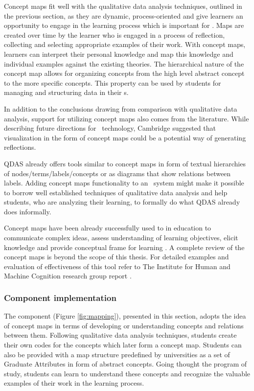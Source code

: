 Concept maps fit well with the qualitative data analysis techniques, outlined in
the previous section, as they are dynamic, process-oriented and give learners an
opportunity to engage in the learning process \citep{Mcaleese1998} which is
important for \LLLs \citep{Schuetze2006,Divjak2004}. Maps are created over time
by the learner who is engaged in a process of reflection, collecting and
selecting appropriate examples of their work. With concept maps, learners can
interpret their personal knowledge and map this knowledge and individual
examples against the existing theories. The hierarchical nature of the concept
map allows for organizing concepts from the high level abstract concept to the
more specific concepts. This property can be used by students for managing and
structuring data in their \ep s. 

In addition to the conclusions drawing from comparison with qualitative data
analysis, support for utilizing concept maps also comes from the literature.
While describing future directions for \ep~technology, Cambridge
\citeyearpar{Cambridge2010} suggested that visualization in the form of concept
maps could be a potential way of generating reflections.

QDAS already offers tools similar to concept maps in form of textual hierarchies
of nodes/terms/labels/concepts or as diagrams that show relations between
labels. Adding concept maps functionality to an \ep~system might make it
possible to borrow well established techniques of qualitative data analysis and
help students, who are analyzing their learning, to formally do what QDAS
already does informally. 

Concept maps have been already successfully used to in education to communicate
complex ideas, assess understanding of learning objectives, elicit knowledge and
provide conceptual frame for learning \citep{Novak2010}. A complete review of
the concept maps is beyond the scope of this thesis. For detailed examples and
evaluation of effectiveness of this tool refer to The Institute for Human and
Machine Cognition research group report \citep{Canas2003}.

\subsubsection{Component implementation}

The component (Figure \ref{fig:mapping}), presented in this section, adopts the
idea of concept maps in terms of developing or understanding concepts and
relations between them. Following qualitative data analysis techniques, students
create their own codes for the concepts which later form a concept map. Students
can also be provided with a map structure predefined by universities as a set of
Graduate Attributes in form of abstract concepts. Going thought the program of
study, students can learn to understand these concepts and recognize the
valuable examples of their work in the learning process.

